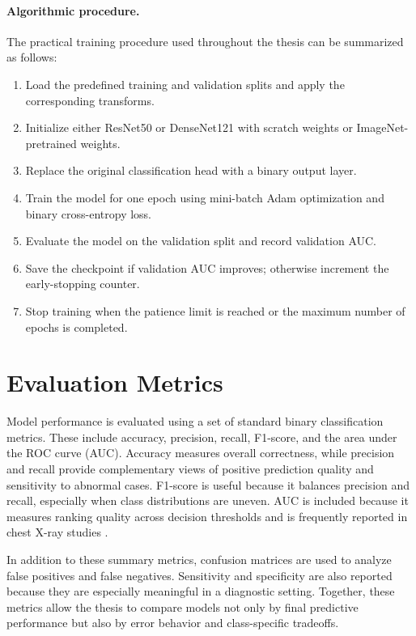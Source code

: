 \paragraph{Algorithmic procedure.}
The practical training procedure used throughout the thesis can be summarized as follows:
\begin{enumerate}
    \item Load the predefined training and validation splits and apply the corresponding transforms.
    \item Initialize either ResNet50 or DenseNet121 with scratch weights or ImageNet-pretrained weights.
    \item Replace the original classification head with a binary output layer.
    \item Train the model for one epoch using mini-batch Adam optimization and binary cross-entropy loss.
    \item Evaluate the model on the validation split and record validation AUC.
    \item Save the checkpoint if validation AUC improves; otherwise increment the early-stopping counter.
    \item Stop training when the patience limit is reached or the maximum number of epochs is completed.
\end{enumerate}

\section{Evaluation Metrics}
Model performance is evaluated using a set of standard binary classification metrics. These include accuracy, precision, recall, F1-score, and the area under the ROC curve (AUC). Accuracy measures overall correctness, while precision and recall provide complementary views of positive prediction quality and sensitivity to abnormal cases. F1-score is useful because it balances precision and recall, especially when class distributions are uneven. AUC is included because it measures ranking quality across decision thresholds and is frequently reported in chest X-ray studies \cite{ref:wang2017,ref:irvin2019}.

In addition to these summary metrics, confusion matrices are used to analyze false positives and false negatives. Sensitivity and specificity are also reported because they are especially meaningful in a diagnostic setting. Together, these metrics allow the thesis to compare models not only by final predictive performance but also by error behavior and class-specific tradeoffs.

